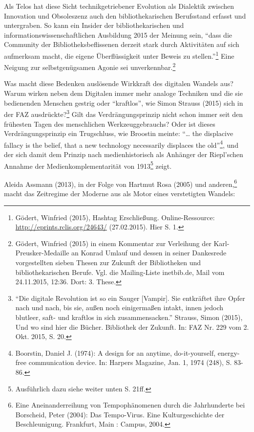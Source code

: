 \documentclass[a4paper,
fontsize=11pt,
oneside,
numbers=noperiodatend,
parskip=half-,
bibliography=totoc,
final
]{scrartcl}
\begin{document}
Als Telos hat diese Sicht technikgetriebener Evolution als Dialektik
zwischen Innovation und Obsoleszenz auch den bibliothekarischen
Berufsstand erfasst und untergraben. So kann ein Insider der
bibliothekarischen und informationswissenschaftlichen Ausbildung 2015
der Meinung sein, \enquote{dass die Community der Bibliotheksbeflissenen
derzeit stark durch Aktivitäten auf sich aufmerksam macht, die eigene
Überflüssigkeit unter Beweis zu stellen.}\footnote{Gödert, Winfried
  (2015), Hashtag Erschließung. Online-Ressource:
  \url{http://eprints.rclis.org/24643/} (27.02.2015). Hier S. 1.} Eine
Neigung zur selbstgenügsamen Agonie sei unverkennbar.\footnote{Gödert,
  Winfried (2015) in einem Kommentar zur Verleihung der
  Karl-Preusker-Medaille an Konrad Umlauf und dessen in seiner
  Dankesrede vorgestellten sieben Thesen zur Zukunft der Bibliotheken
  und bibliothekarischen Berufe. Vgl. die Mailing-Liste inetbib.de, Mail
  vom 24.11.2015, 12:36. Dort: 3. These.}

Was macht diese Bedenken auslösende Wirkkraft des digitalen Wandels aus?
Warum wirken neben dem Digitalen immer mehr analoge Techniken und die
sie bedienenden Menschen gestrig oder \enquote{kraftlos}, wie Simon
Strauss (2015) sich in der FAZ ausdrückte?\footnote{\enquote{Die
  digitale Revolution ist so ein Sauger {[}Vampir{]}. Sie entkräftet
  ihre Opfer nach und nach, bis sie, außen noch einigermaßen intakt,
  innen jedoch blutleer, saft- und kraftlos in sich zusammensacken.}
  Strauss, Simon (2015), Und wo sind hier die Bücher. Bibliothek der
  Zukunft. In: FAZ Nr. 229 vom 2. Okt. 2015, S. 20.} Gilt das
Verdrängungsprinzip nicht schon immer seit den frühesten Tagen des
menschlichen Werkzeuggebrauchs? Oder ist dieses Verdrängungsprinzip ein
Trugschluss, wie Broostin meinte: \enquote{\ldots{} the displacive
fallacy is the belief, that a new technology necessarily displaces the
old}\footnote{Boorstin, Daniel J. (1974): A design for an anytime,
  do-it-yourself, energy-free communication device. In: Harpers
  Magazine, Jan. 1, 1974 (248), S. 83-86.}, und der sich damit dem
Prinzip nach medienhistorisch als Anhänger der Riepl'schen Annahme der
Medienkomplementarität von 1913\footnote{Ausführlich dazu siehe weiter
  unten S. 21ff.} zeigt.

Aleida Assmann (2013), in der Folge von Hartmut Rosa (2005) und
anderen,\footnote{Eine Aneinanderreihung von Tempophänomenen durch die
  Jahrhunderte bei Borscheid, Peter (2004): Das Tempo-Virus. Eine
  Kulturgeschichte der Beschleunigung. Frankfurt, Main : Campus, 2004.}
macht das Zeitregime der Moderne aus als Motor eines verstetigten
Wandels:
\end{document}
